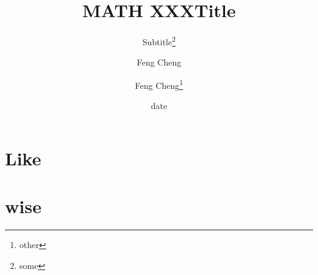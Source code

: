 \documentclass[11pt,twoside]{article}
\author{Feng Cheng}
\title{MATH XXX}
\title{Title}
\subtitle{Subtitle\thanks{some}}
\author{Feng Cheng\thanks{other}}
\date{date}
\begin{document}
\maketitle\thispagestyle{plain}

\Blindtext\Blindtext
\section{Like}
\Blindtext
\section{wise}
\end{document}
